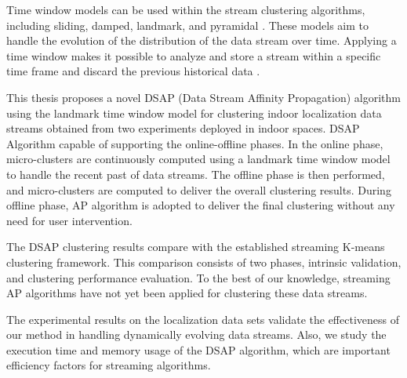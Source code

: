 Time window models can be used within the stream clustering algorithms, including sliding, damped, landmark, and pyramidal \cite{nguyen2015survey}. These models aim to handle the evolution of the distribution of the data stream over time. Applying a time window makes it possible to analyze and store a stream within a specific time frame and discard the previous historical data \cite{mansalis2018evaluation}.

This thesis proposes a novel DSAP (Data Stream Affinity Propagation) algorithm using the landmark time window model for clustering indoor localization data streams obtained from two experiments deployed in indoor spaces. DSAP Algorithm capable of supporting the online-offline phases. In the online phase, micro-clusters are continuously computed using a landmark time window model to handle the recent past of data streams. The offline phase is then performed, and micro-clusters are computed to deliver the overall clustering results. During offline phase, AP algorithm is adopted to deliver the final clustering without any need for user intervention.

The DSAP clustering results compare with the established streaming K-means clustering framework. This comparison consists of two phases, intrinsic validation, and clustering performance evaluation.
To the best of our knowledge, streaming AP algorithms have not yet been applied for clustering these data streams. 

The experimental results on the localization data sets validate the effectiveness of our method in handling
dynamically evolving data streams. Also, we study the execution time and memory usage of the DSAP algorithm, which are important efficiency factors for streaming algorithms.











